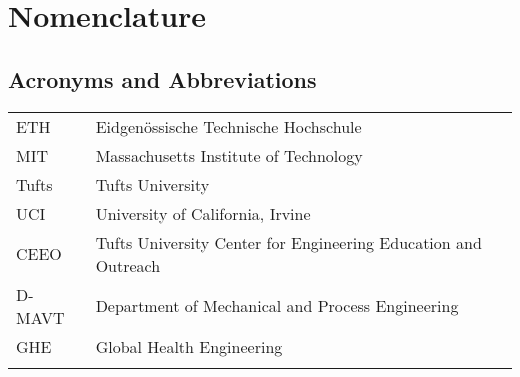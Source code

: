 \newpage%
\clearpage%

\chapter*{Nomenclature}%
%
%
%

\section*{Acronyms and Abbreviations}
{\renewcommand{\arraystretch}{1.1} \renewcommand{\tabcolsep}{0.2cm}
\begin{longtable}[h]{@{}p{} @{}p{}@{}}
ETH				& Eidgen\"ossische Technische Hochschule \\
MIT             & Massachusetts Institute of Technology \\
Tufts           & Tufts University \\
UCI             & University of California, Irvine \\
CEEO            & Tufts University Center for Engineering Education and Outreach \\
D-MAVT			& Department of Mechanical and Process Engineering \\
GHE 			& Global Health Engineering \\\\


\end{longtable}}
